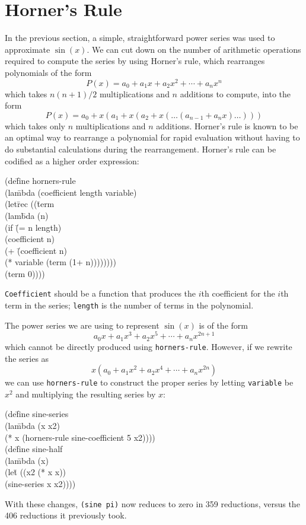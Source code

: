 \section{Horner's Rule}

	In the previous section, a simple, straightforward power series was
used to approximate $\sin(x)$.  We can cut down on the number of
arithmetic operations required to compute the series by using Horner's
rule, which rearranges polynomials of the form
\[ P(x) = a_0 + a_1x + a_2x^2 + \cdots + a_nx^n \]
which takes \(n(n+1)/2\) multiplications and $n$ additions to compute,
into the form
\[ P(x) = a_{0} + x(a_1 + x(a_{2} + x(\ldots(a_{n-1} + a_nx)\ldots)))\]
which takes only $n$ multiplications and $n$ additions.
Horner's rule is known to be an optimal way to rearrange a polynomial 
for rapid evaluation without having to do substantial calculations
during the rearrangement.  Horner's rule can be codified as a higher order
expression:
\begin{tt}\begin{tabbing}
(de\=fine horners-rule\\
\>	(la\=mbda (coefficient length variable)\\
\>\>	(let\=rec ((\=term  \\
\>\>\>\>			 	(lam\=bda (n)\\
\>\>\>\>\>				(if \=(= n length)\\
\>\>\>\>\>\>				(coefficient n)\\
\>\>\>\>\>\>				(+ \=(coefficient n)\\
\>\>\>\>\>\>\>					(* variable (term (1+ n))))))))\\
\>\>\>		(term 0))))
\end{tabbing}\end{tt}
{\tt Coefficient} should be a function that produces the
$i$th coefficient for the $i$th term in the series; {\tt length} is the
number of terms in the polynomial.

	The power series we are using to represent $\sin(x)$ is of
the form
\[ a_0x + a_1x^3 + a_2x^5 + \cdots + a_nx^{2n+1} \]
which cannot be directly produced using {\tt horners-rule}.  However, if we
rewrite the series as
\[ x(a_0 + a_1x^2 + a_2x^4 + \cdots + a_nx^{2n}) \]
we can use {\tt horners-rule} to construct the proper series by letting 
{\tt variable} be $x^2$ and multiplying the resulting series by $x$:
\begin{tt}\begin{tabbing}
(de\=fine sine-series\\
\>	(la\=mbda (x x2)\\
\>\>		(* x (horners-rule sine-coefficient 5 x2))))\\[.10in]
\kill
(de\=fine sine-half\\
\> (la\=mbda (x)\\
\>\>	(le\=t ((x2 (* x x))\\
\>\>\>	(sine-series x x2))))
\end{tabbing}\end{tt}
With these changes, {\tt (sine pi)} now reduces to zero in 359
reductions, versus the 406 reductions it previously took.

